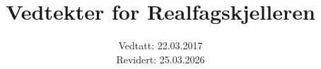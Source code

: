 \documentclass[titlepage]{article} %
\begin{document}
\begin{titlepage}
    \title{\huge{\textbf{Vedtekter for Realfagskjelleren}}}
    \date{Vedtatt: 22.03.2017 \\
    Revidert: 25.03.2026}
    \titlepic{}
    \maketitle
\end{titlepage}
\clearpage
\setcounter{page}{1}

\tableofcontents
\newpage











\end{document}
